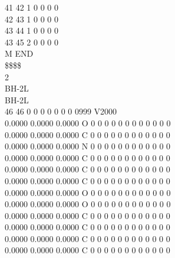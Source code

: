 \documentclass[11pt,titlepage,dvipdfmx,twoside]{article}
\begin{document}
\begin{oframed}
{ 41 42  1  0  0  0  0                                                      \\
 42 43  1  0  0  0  0                                                      \\
 43 44  1  0  0  0  0                                                      \\
 43 45  2  0  0  0  0                                                      \\
M  END                                                                     \\
\$\$\$\$                                                                       \\
2                                                                          \\
BH-2L                                                                      \\
BH-2L                                                                      \\
 46 46  0  0  0  0  0  0  0  0999 V2000                                    \\
    0.0000    0.0000    0.0000  O  0  0  0  0  0  0  0  0  0  0  0  0      \\
    0.0000    0.0000    0.0000  C  0  0  0  0  0  0  0  0  0  0  0  0      \\
    0.0000    0.0000    0.0000  N  0  0  0  0  0  0  0  0  0  0  0  0      \\
    0.0000    0.0000    0.0000  C  0  0  0  0  0  0  0  0  0  0  0  0      \\
    0.0000    0.0000    0.0000  C  0  0  0  0  0  0  0  0  0  0  0  0      \\
    0.0000    0.0000    0.0000  C  0  0  0  0  0  0  0  0  0  0  0  0      \\
    0.0000    0.0000    0.0000  O  0  0  0  0  0  0  0  0  0  0  0  0      \\
    0.0000    0.0000    0.0000  O  0  0  0  0  0  0  0  0  0  0  0  0      \\
    0.0000    0.0000    0.0000  C  0  0  0  0  0  0  0  0  0  0  0  0      \\
    0.0000    0.0000    0.0000  C  0  0  0  0  0  0  0  0  0  0  0  0      \\
    0.0000    0.0000    0.0000  C  0  0  0  0  0  0  0  0  0  0  0  0      \\
    0.0000    0.0000    0.0000  C  0  0  0  0  0  0  0  0  0  0  0  0      \\
}
\end{oframed}
\end{document}
